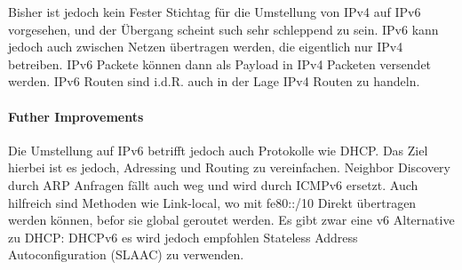             Bisher ist jedoch kein Fester Stichtag für die Umstellung von IPv4 auf IPv6 vorgesehen, und der Übergang scheint such sehr schleppend zu sein. IPv6 kann jedoch auch zwischen Netzen übertragen werden, die eigentlich nur IPv4 betreiben. IPv6 Packete können dann als Payload in IPv4 Packeten versendet werden. IPv6 Routen sind i.d.R. auch in der Lage IPv4 Routen zu handeln. 

            \paragraph{Futher Improvements}
                Die Umstellung auf IPv6 betrifft jedoch auch Protokolle wie DHCP. Das Ziel hierbei ist es jedoch, Adressing und Routing zu vereinfachen. Neighbor Discovery durch ARP Anfragen fällt auch weg und wird durch ICMPv6 ersetzt. Auch hilfreich sind Methoden wie Link-local, wo mit fe80::/10 Direkt übertragen werden können, befor sie global geroutet werden. Es gibt zwar eine v6 Alternative zu DHCP: DHCPv6 es wird jedoch empfohlen Stateless Address Autoconfiguration (SLAAC) zu verwenden.


